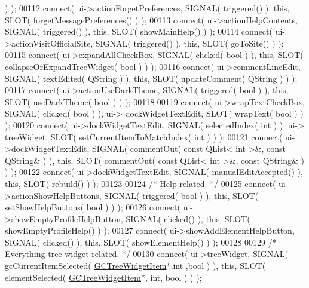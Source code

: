 \begin{DoxyCode}
      ) );
00112   connect( ui->actionForgetPreferences, SIGNAL( triggered() ), \textcolor{keyword}{this}, SLOT( 
      forgetMessagePreferences() ) );
00113   connect( ui->actionHelpContents, SIGNAL( triggered() ), \textcolor{keyword}{this}, SLOT( 
      showMainHelp() ) );
00114   connect( ui->actionVisitOfficialSite, SIGNAL( triggered() ), \textcolor{keyword}{this}, SLOT( 
      goToSite() ) );
00115   connect( ui->expandAllCheckBox, SIGNAL( clicked( \textcolor{keywordtype}{bool} ) ), \textcolor{keyword}{this}, SLOT( 
      collapseOrExpandTreeWidget( \textcolor{keywordtype}{bool} ) ) );
00116   connect( ui->commentLineEdit, SIGNAL( textEdited( QString ) ), \textcolor{keyword}{this}, SLOT( 
      updateComment( QString ) ) );
00117   connect( ui->actionUseDarkTheme, SIGNAL( triggered( \textcolor{keywordtype}{bool} ) ), \textcolor{keyword}{this}, SLOT( 
      useDarkTheme( \textcolor{keywordtype}{bool} ) ) );
00118 
00119   connect( ui->wrapTextCheckBox, SIGNAL( clicked( \textcolor{keywordtype}{bool} ) ), ui->
      dockWidgetTextEdit, SLOT( wrapText( \textcolor{keywordtype}{bool} ) ) );
00120   connect( ui->dockWidgetTextEdit, SIGNAL( selectedIndex( \textcolor{keywordtype}{int} ) ), ui->
      treeWidget, SLOT( setCurrentItemToMatchIndex( \textcolor{keywordtype}{int} ) ) );
00121   connect( ui->dockWidgetTextEdit, SIGNAL( commentOut( \textcolor{keyword}{const} QList< int >&, \textcolor{keyword}{
      const} QString& ) ), \textcolor{keyword}{this}, SLOT( commentOut( \textcolor{keyword}{const} QList< int >&, \textcolor{keyword}{const} QString& ) )
       );
00122   connect( ui->dockWidgetTextEdit, SIGNAL( manualEditAccepted() ), \textcolor{keyword}{this}, SLOT( 
      rebuild() ) );
00123 
00124   \textcolor{comment}{/* Help related. */}
00125   connect( ui->actionShowHelpButtons, SIGNAL( triggered( \textcolor{keywordtype}{bool} ) ), \textcolor{keyword}{this}, SLOT( 
      setShowHelpButtons( \textcolor{keywordtype}{bool} ) ) );
00126   connect( ui->showEmptyProfileHelpButton, SIGNAL( clicked() ), \textcolor{keyword}{this}, SLOT( 
      showEmptyProfileHelp() ) );
00127   connect( ui->showAddElementHelpButton, SIGNAL( clicked() ), \textcolor{keyword}{this}, SLOT( 
      showElementHelp() ) );
00128 
00129   \textcolor{comment}{/* Everything tree widget related. */}
00130   connect( ui->treeWidget, SIGNAL( gcCurrentItemSelected( \hyperlink{class_g_c_tree_widget_item}{GCTreeWidgetItem}*,\textcolor{keywordtype}{int}
      ,\textcolor{keywordtype}{bool} ) ), \textcolor{keyword}{this}, SLOT( elementSelected( \hyperlink{class_g_c_tree_widget_item}{GCTreeWidgetItem}*, \textcolor{keywordtype}{int}, \textcolor{keywordtype}{bool} ) ) );

\end{DoxyCode}
